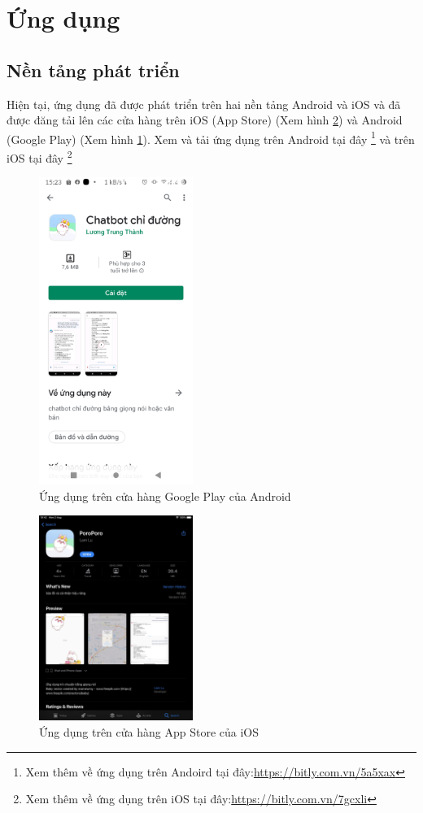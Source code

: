 \section{Ứng dụng}
\subsection{Nền tảng phát triển}
Hiện tại, ứng dụng đã được phát triển trên hai nền tảng Android và iOS và đã được đăng tải lên các cửa hàng trên iOS (App Store) (Xem hình \ref{fig:app-store}) và Android (Google Play) (Xem hình \ref{fig:google-play}). Xem và tải ứng dụng trên Android tại đây \footnote{Xem thêm về ứng dụng trên Andoird tại đây:\url{https://bitly.com.vn/5a5xax}} và trên iOS tại đây \footnote{Xem thêm về ứng dụng trên iOS tại đây:\url{https://bitly.com.vn/7gcxli}}

\begin{figure}[H]
    \centering
    \includegraphics[width=5cm]{images/GooglePlay.jpg}
    \caption{Ứng dụng trên cửa hàng Google Play của Android}
    \label{fig:google-play}
\end{figure}

\begin{figure}[H]
    \centering
    \includegraphics[width=5cm]{images/AppStore.jpg}
    \caption{Ứng dụng trên cửa hàng App Store của iOS}
    \label{fig:app-store}
\end{figure}

